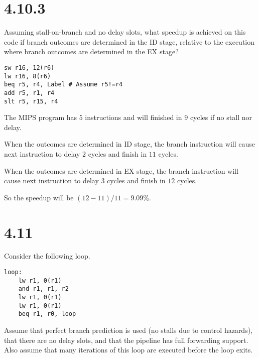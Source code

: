\documentclass[paper=a4, fontsize=11pt]{scrartcl} %
\begin{document}
\maketitle %

\section{4.10.3}

\begin{fancyquotes}
    Assuming stall-on-branch and no delay slots, what speedup is achieved on this code if branch outcomes are determined in the ID stage, relative to the execution where branch outcomes are determined in the EX stage?
\end{fancyquotes}

\begin{lstlisting}[language={[mips]Assembler}]
sw r16, 12(r6)
lw r16, 8(r6)
beq r5, r4, Label # Assume r5!=r4
add r5, r1, r4
slt r5, r15, r4
\end{lstlisting}

The MIPS program has $5$ instructions and will finished in $9$ cycles if no stall nor delay.

When the outcomes are determined in ID stage, the branch instruction will cause next instruction to delay $2$ cycles and finish in $11$ cycles.

When the outcomes are determined in EX stage, the branch instruction will cause next instruction to delay $3$ cycles and finish in $12$ cycles.

So the speedup will be $(12-11)/11=9.09\%$.


\section{4.11}
\begin{fancyquotes}
    Consider the following loop.

\begin{lstlisting}[language={[mips]Assembler}]
loop:
    lw r1, 0(r1)
    and r1, r1, r2
    lw r1, 0(r1)
    lw r1, 0(r1)
    beq r1, r0, loop
\end{lstlisting}

    Assume that perfect branch prediction is used (no stalls due to control hazards), that there are no delay slots, and that the pipeline has full forwarding support. Also assume that many iterations of this loop are executed before the loop exits.
\end{fancyquotes}
\end{document}
